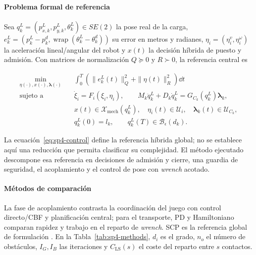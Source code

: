\paragraph{Problema formal de referencia}

Sea $q_k^L=(p_{x,k}^L,p_{y,k}^L,\theta_k^L)\in SE(2)$ la pose real de la carga, $e_k^L=(p_k^L-p_k^d,\operatorname{wrap}(\theta_k^L-\theta_k^d))$ su error en metros y radianes, $\eta_i=(\eta_i^v,\eta_i^\omega)$ la aceleración lineal/angular del robot y $x(t)$ la decisión híbrida de puesto y admisión. Con matrices de normalización $Q\succeq0$ y $R\succ0$, la referencia central es

\begin{equation}
\label{eq:sp4-control}
\begin{aligned}
  \min_{\eta(\cdot),x(\cdot),\boldsymbol\lambda(\cdot)}\quad
  & \int_{0}^{T}\!\left(\|e_k^L(t)\|_{Q}^{2}
    +\|\eta(t)\|_{R}^{2}\right)\dd t \\
  \text{sujeto a}\quad
  & \dot\xi_i=F_i(\xi_i,\eta_i),\qquad
    M_k\ddot q_k^L+D_k\dot q_k^L=G_{C_k}(q_k^L)\boldsymbol\lambda_k,\\
  & x(t)\in\mathcal X_{\mathrm{mech}}(q_k^L),\quad
    \eta_i(t)\in\mathcal U_i,\quad
    \boldsymbol\lambda_k(t)\in\mathcal U_{C_k},\\
  & q_k^L(0)=l_k,\qquad q_k^L(T)\in\mathcal B_{\epsilon}(d_k).
\end{aligned}
\end{equation}

La ecuación~\eqref{eq:sp4-control} define la referencia híbrida global; no se establece aquí una reducción que permita clasificar su complejidad. El método ejecutado descompone esa referencia en decisiones de admisión y cierre, una guardia de seguridad, el acoplamiento y el control de pose con \emph{wrench} acotado.

\paragraph{Métodos de comparación}

La fase de acoplamiento contrasta la coordinación del juego con control directo/CBF y planificación central; para el transporte, PD y Hamiltoniano comparan rapidez y trabajo en el reparto de \emph{wrench}. SCP es la referencia global de formulación \parencite{alonsomora2017transport}. En la Tabla~\ref{tab:sp4-methods}, $d_i$ es el grado, $n_o$ el número de obstáculos, $I_G,I_B$ las iteraciones y $C_{\mathrm{LS}}(s)$ el coste del reparto entre $s$ contactos.

